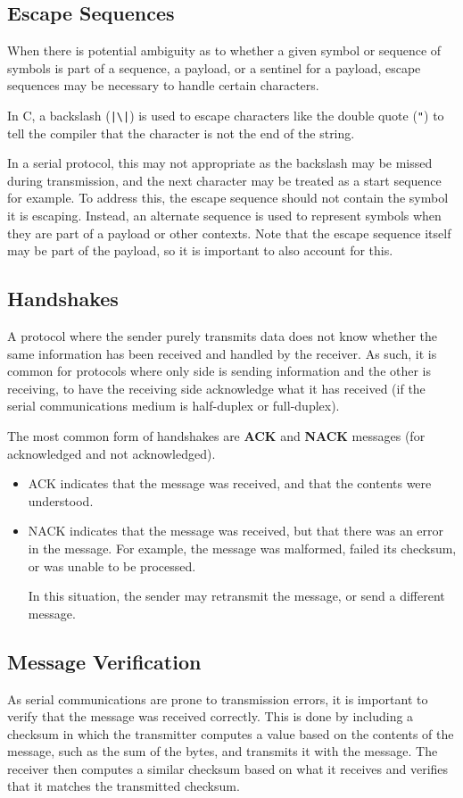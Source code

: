 \documentclass[a4paper]{report}
\begin{document}
\subsection{Escape Sequences}
When there is potential ambiguity as to whether a given symbol or sequence of symbols is
part of a sequence, a payload, or a sentinel for a payload, escape sequences may be
necessary to handle certain characters.

In C, a backslash (\texttt{|\backslash|}) is used to escape characters
like the double quote (\texttt{"}) to tell the compiler that the character is not the end of the string. %

In a serial protocol, this may not appropriate as the backslash may be missed during transmission,
and the next character may be treated as a start sequence for example. To address this, the escape
sequence should not contain the symbol it is escaping.
Instead, an alternate sequence is used to represent symbols when they are part of a payload or
other contexts. Note that the escape sequence itself may be part of the payload, so it is important
to also account for this.
\subsection{Handshakes}
A protocol where the sender purely transmits data does not know whether the same information
has been received and handled by the receiver. As such, it is common for protocols where
only side is sending information and the other is receiving, to have the receiving side
acknowledge what it has received (if the serial communications medium is half-duplex or full-duplex).

The most common form of handshakes are \textbf{ACK} and \textbf{NACK} messages (for acknowledged
and not acknowledged).
\begin{itemize}
    \item ACK indicates that the message was received, and that the contents were understood.
    \item NACK indicates that the message was received, but that there was an error in the message.
    For example, the message was malformed, failed its checksum, or was unable to be processed.

    In this situation, the sender may retransmit the message, or send a different message.
\end{itemize}
\subsection{Message Verification}
As serial communications are prone to transmission errors, it is important to verify that the
message was received correctly. This is done by including a checksum in which the transmitter
computes a value based on the contents of the message, such as the sum of the bytes, and
transmits it with the message. The receiver then computes a similar checksum based
on what it receives and verifies that it matches the transmitted checksum.
\end{document}

